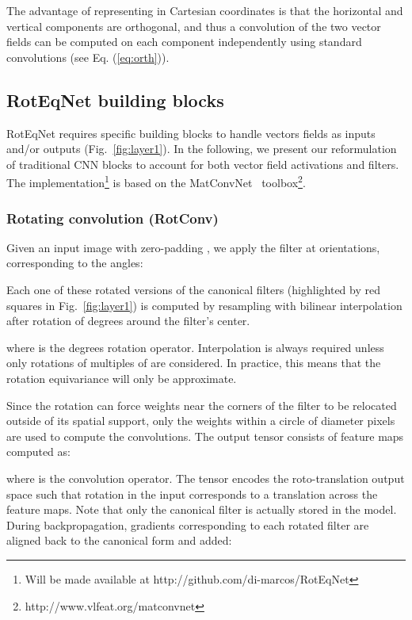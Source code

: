 \documentclass[10pt,twocolumn,letterpaper,table]{article}
\begin{document}
The advantage of representing  in Cartesian coordinates is that the horizontal and vertical components  are orthogonal, and thus a convolution of the two vector fields can be computed on each component independently using standard convolutions (see Eq. (\ref{eq:orth})).

\subsection{RotEqNet building blocks}
	
RotEqNet requires specific building blocks to handle vectors fields as inputs and/or outputs (Fig.~\ref{fig:layer1}). In the following, we present our reformulation of traditional CNN blocks to account for both vector field activations and filters. The implementation\footnote{Will be made available at http://github.com/di-marcos/RotEqNet} is based on the MatConvNet~\cite{vedaldi15matconvnet} toolbox\footnote{http://www.vlfeat.org/matconvnet}.
	
\subsubsection{Rotating convolution (RotConv)}\label{met:rot_conv}
	
Given an input image with  zero-padding , we apply the filter  at  orientations, corresponding to the angles:

Each one of these rotated versions of the canonical filters (highlighted by red squares in Fig.~\ref{fig:layer1}) is computed by resampling  with bilinear interpolation after rotation of  degrees around the filter's center.

where  is the  degrees rotation operator. Interpolation is always required unless only rotations of multiples of  are considered. In practice, this means that the rotation equivariance will only be approximate. 
	
Since the rotation can force weights near the corners of the filter to be relocated outside of its spatial support, only the weights within a circle of diameter  pixels are used to compute the convolutions. The output tensor   consists of  feature maps computed as:

where  is the convolution operator.
The tensor  encodes the roto-translation output space such that rotation in the input corresponds to a translation across the feature maps. Note that only the canonical filter  is actually stored in the model. During backpropagation, gradients corresponding to each rotated filter  are aligned back to the canonical form and added: 
\end{document}
